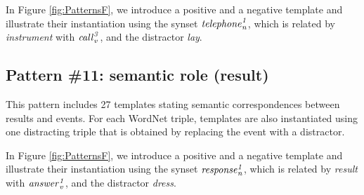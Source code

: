 \documentclass[11pt]{article}
\newcommand{\WORDNET}{WordNet}
\newcommand{\synset}[3]{{\it{#1}_{#3}^{#2}}}
\begin{document}
In Figure \ref{fig:PatternsF}, we introduce a positive and a negative template and illustrate their instantiation using the synset $\synset{telephone}{1}{n}$, which is related by {\it instrument} with $\synset{call}{3}{v}$, and the distractor {\it lay}.

\subsection{Pattern \#11: semantic role (result)}

This pattern includes 27 templates stating semantic correspondences between results and events. For each \WORDNET{} triple, templates are also instantiated using one distracting triple that is obtained by replacing the event with a distractor.

In Figure \ref{fig:PatternsF}, we introduce a positive and a negative template and illustrate their instantiation using the synset $\synset{response}{1}{n}$, which is related by {\it result} with $\synset{answer}{1}{v}$, and the distractor {\it dress}.
\end{document}
